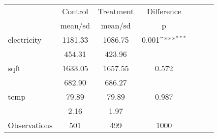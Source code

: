 {
\def\sym#1{\ifmmode^{#1}\else\(^{#1}\)\fi}
\begin{tabular}{l*{3}{cc}}
\hline\hline
                    &\multicolumn{1}{c}{Control}&\multicolumn{1}{c}{Treatment}&\multicolumn{1}{c}{Difference}\\
                    &     mean/sd&     mean/sd&           p         \\
\hline
electricity         &     1181.33&     1086.75&       0.001\sym{***}\\
                    &      454.31&      423.96&                     \\
sqft                &     1633.05&     1657.55&       0.572         \\
                    &      682.90&      686.27&                     \\
temp                &       79.89&       79.89&       0.987         \\
                    &        2.16&        1.97&                     \\
\hline
Observations        &         501&         499&        1000         \\
\hline\hline
\end{tabular}
}
